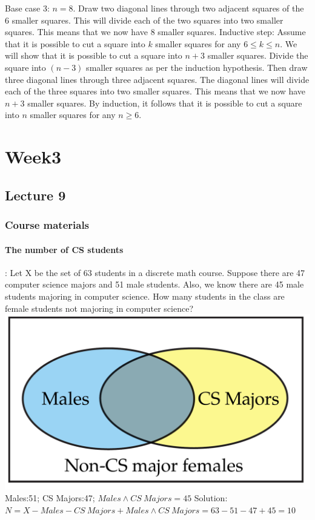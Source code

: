 \documentclass{article}
\begin{document}
\newline
Base case 3: $n = 8$. Draw two diagonal lines through two adjacent squares of the 6 smaller squares. This will divide each of the two squares into two smaller squares. This means that we now have 8 smaller squares.
\newline
Inductive step: Assume that it is possible to cut a square into $k$ smaller squares for any $6 \le k \le n$. We will show that it is possible to cut a square into $n + 3$ smaller squares.
\newline
Divide the square into $(n-3)$ smaller squares as per the induction hypothesis. Then draw three diagonal lines through three adjacent squares. The diagonal lines will divide each of the three squares into two smaller squares. This means that we now have $n + 3$ smaller squares.
\newline
By induction, it follows that it is possible to cut a square into $n$ smaller squares for any $n \ge 6$.
\newpage \section{Week3}
\subsection{Lecture 9}
\subsubsection{Course materials}
\paragraph{The number of CS students}:\newline
Let X be the set of 63 students in a discrete math course.
Suppose there are 47 computer science majors and 51 male
students.
Also, we know there are 45 male students majoring in computer
science. \newline
How many students in the class are female students not
majoring in computer science?\newline
\includegraphics{0004}\newline
Males:51; CS Majors:47; $Males \land CS \ Majors=45$\newline
Solution:\newline
$N=X-Males-CS \ Majors +Males \land CS \ Majors=63-51-47+45=10$
\end{document}
